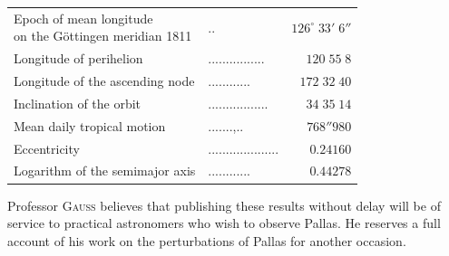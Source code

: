 \begin{center}\fontsize{10}{12}\selectfont\setlength{\tabcolsep}{4pt}\renewcommand{\arraystretch}{1.15}\begin{tabular}{llr}
\shortstack[l]{Epoch of mean longitude\\on the Göttingen meridian 1811} & .\;. & $126^\circ\;33'\;6''$\\
Longitude of perihelion & .\;.\;.\;.\;.\;.\;.\;.\;.\;.\;.\;.\;.\;.\;.\;. & $120\;55\;8$\\
Longitude of the ascending node & .\;.\;.\;.\;.\;.\;.\;.\;.\;.\;.\;. & $172\;32\;40$\\
Inclination of the orbit & .\;.\;.\;.\;.\;.\;.\;.\;.\;.\;.\;.\;.\;.\;.\;.\;. & $34\;35\;14$\\
Mean daily tropical motion & .\;.\;.\;.\;.\;.\;.\;,\;.\;. & $768''980$\\
Eccentricity & .\;.\;.\;.\;.\;.\;.\;.\;.\;.\;.\;.\;.\;.\;.\;.\;.\;.\;.\;. & $0.24160$\\
Logarithm of the semimajor axis & .\;.\;.\;.\;.\;.\;.\;.\;.\;.\;.\;. & $0.44278$\\
\end{tabular}\end{center}

\par\indent Professor \textsc{Gauss} believes that publishing these results without delay will be of service to practical astronomers who wish to observe Pallas. He reserves a full account of his work on the perturbations of Pallas for another occasion.

